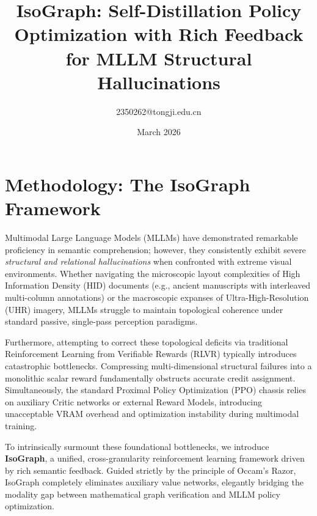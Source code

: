 \documentclass{article}
\title{IsoGraph: Self-Distillation Policy Optimization with Rich Feedback for MLLM Structural Hallucinations}
\author{2350262@tongji.edu.cn}
\date{March 2026}
\begin{document}
\maketitle

\section{Methodology: The IsoGraph Framework}
\label{sec:methodology}

Multimodal Large Language Models (MLLMs) have demonstrated remarkable proficiency in semantic comprehension; however, they consistently exhibit severe \textit{structural and relational hallucinations} when confronted with extreme visual environments. Whether navigating the microscopic layout complexities of High Information Density (HID) documents (e.g., ancient manuscripts with interleaved multi-column annotations) or the macroscopic expanses of Ultra-High-Resolution (UHR) imagery, MLLMs struggle to maintain topological coherence under standard passive, single-pass perception paradigms. 

Furthermore, attempting to correct these topological deficits via traditional Reinforcement Learning from Verifiable Rewards (RLVR) typically introduces catastrophic bottlenecks. Compressing multi-dimensional structural failures into a monolithic scalar reward fundamentally obstructs accurate credit assignment. Simultaneously, the standard Proximal Policy Optimization (PPO) chassis relies on auxiliary Critic networks or external Reward Models, introducing unacceptable VRAM overhead and optimization instability during multimodal training.

To intrinsically surmount these foundational bottlenecks, we introduce \textbf{IsoGraph}, a unified, cross-granularity reinforcement learning framework driven by rich semantic feedback. Guided strictly by the principle of Occam's Razor, IsoGraph completely eliminates auxiliary value networks, elegantly bridging the modality gap between mathematical graph verification and MLLM policy optimization. 
\end{document}
